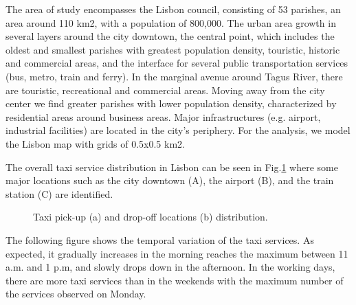 \documentclass[a4paper, 10pt, conference]{ieeeconf}      %
\begin{document}
The area of study encompasses the Lisbon council, consisting of 53 parishes, an area around 110 km2, with a population of 800,000. The urban area growth in several layers around the city downtown, the central point, which includes the oldest and smallest parishes with greatest population density, touristic, historic and commercial areas, and the interface for several public transportation services (bus, metro, train and ferry).  In the marginal avenue around Tagus River, there are touristic, recreational and commercial areas. Moving away from the city center we find greater parishes with lower population density, characterized by residential areas around business areas. Major infrastructures (e.g. airport, industrial facilities) are located in the city’s periphery. For the analysis, we model the Lisbon map with grids of 0.5x0.5 km2. 

The overall taxi service distribution in Lisbon can be seen in Fig.\ref{fig:my_png_1} where some major locations such as the city downtown (A), the airport (B), and the train station (C) are identified.  

\begin{figure}[ht]
    \centering
    \caption{ Taxi pick-up (a) and drop-off locations (b) distribution. }
    \label{fig:my_png_1}
\end{figure}

The following figure shows the temporal variation of the taxi services. As expected, it gradually increases in the morning reaches the maximum between 11 a.m. and 1 p.m, and slowly drops down in the afternoon. In the working days, there are more taxi services than in the weekends with the maximum number of the services observed on Monday. 
\end{document}

